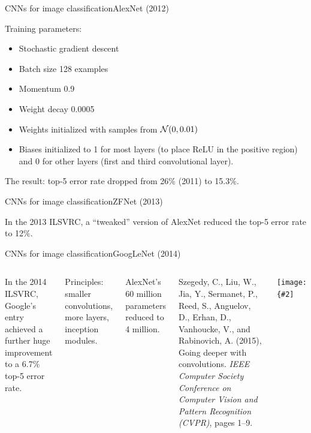 \documentclass{beamer}
\newcommand{\myfig}[3]{\centerline{\texttt{[image: \{\#2]}}}
\begin{document}
\begin{frame}{CNNs for image classification}{AlexNet (2012)}

  Training parameters:
  \begin{itemize}
  \item Stochastic gradient descent
  \item Batch size 128 examples
  \item Momentum 0.9
  \item Weight decay 0.0005
  \item Weights initialized with samples from ${\cal N}(0,0.01)$
  \item Biases initialized to 1 for most layers (to place ReLU in the
    positive region) and 0 for other layers (first and third
    convolutional layer).
  \end{itemize}

  \medskip

  The result: top-5 error rate dropped from 26\% (2011) to 15.3\%. 
  
\end{frame}


\begin{frame}{CNNs for image classification}{ZFNet (2013)}

  In the 2013 ILSVRC, a ``tweaked'' version of AlexNet reduced the
  top-5 error rate to 12\%.
  
\end{frame}


\begin{frame}{CNNs for image classification}{GoogLeNet (2014)}

  \begin{columns}

    \column{3in}

    In the 2014 ILSVRC, Google's entry achieved a further huge
    improvement to a 6.7\% top-5 error rate.

    \medskip

    Principles: smaller convolutions, more layers, \alert{inception}
    modules.

    \medskip

    AlexNet's 60 million parameters reduced to 4 million.

    \medskip

    Szegedy, C., Liu, W., Jia, Y., Sermanet, P., 
    Reed, S., Anguelov, D., Erhan, D., Vanhoucke, V., and 
    Rabinovich, A. (2015), Going deeper with convolutions.
    \textit{IEEE Computer Society Conference on Computer Vision and Pattern
    Recognition (CVPR)}, pages 1--9.

    \column{1.5in}

    \myfig{0.6in}{szegedy-fig3}{Szegedy et al.\ (2014), Fig.\ 3}

  \end{columns}
  
\end{frame}
\end{document}
